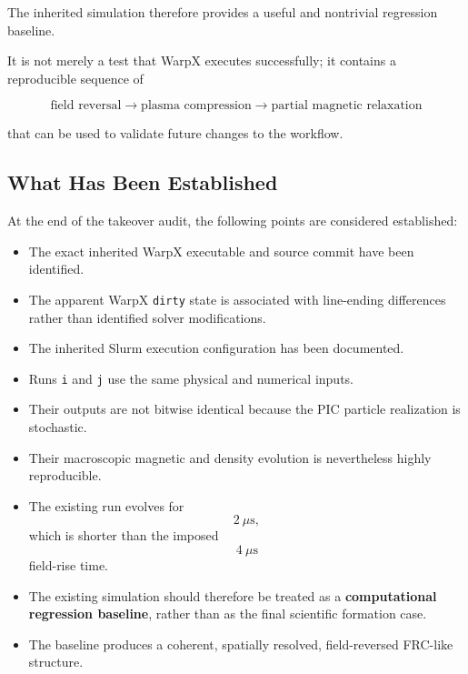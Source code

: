 \documentclass[11pt,a4paper]{article}
\begin{document}
The inherited simulation therefore provides a useful and nontrivial
regression baseline.

It is not merely a test that WarpX executes successfully; it contains a
reproducible sequence of

\[
\boxed{
\text{field reversal}
\rightarrow
\text{plasma compression}
\rightarrow
\text{partial magnetic relaxation}
}
\]

that can be used to validate future changes to the workflow.


\subsection{What Has Been Established}

At the end of the takeover audit, the following points are considered
established:

\begin{itemize}

    \item The exact inherited WarpX executable and source commit have been
    identified.

    \item The apparent WarpX \texttt{dirty} state is associated with
    line-ending differences rather than identified solver modifications.

    \item The inherited Slurm execution configuration has been documented.

    \item Runs \texttt{i} and \texttt{j} use the same physical and numerical
    inputs.

    \item Their outputs are not bitwise identical because the PIC particle
    realization is stochastic.

    \item Their macroscopic magnetic and density evolution is nevertheless
    highly reproducible.

    \item The existing run evolves for
    \[
    2~\mu\mathrm{s},
    \]
    which is shorter than the imposed
    \[
    4~\mu\mathrm{s}
    \]
    field-rise time.

    \item The existing simulation should therefore be treated as a
    \textbf{computational regression baseline}, rather than as the final
    scientific formation case.

    \item The baseline produces a coherent, spatially resolved,
    field-reversed FRC-like structure.

\end{itemize}
\end{document}
